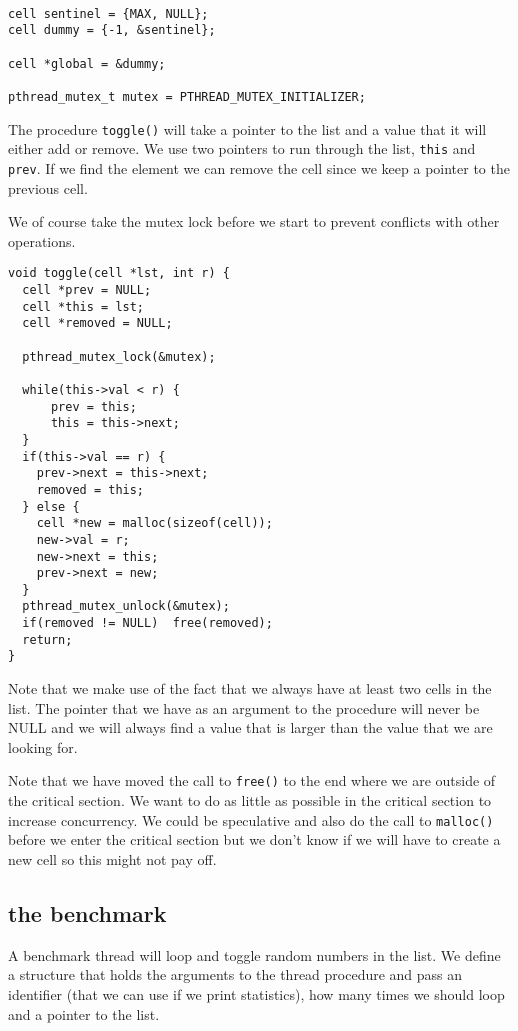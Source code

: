 \documentclass[a4paper,11pt]{article}
\begin{document}
\begin{lstlisting}

cell sentinel = {MAX, NULL};
cell dummy = {-1, &sentinel};

cell *global = &dummy;

pthread_mutex_t mutex = PTHREAD_MUTEX_INITIALIZER;
\end{lstlisting}

The procedure {\tt toggle()} will take a pointer to the list and a
value that it will either add or remove. We use two pointers to run
through the list, {\tt this} and {\tt prev}. If we find the element we
can remove the cell since we keep a pointer to the previous cell.

We of course take the mutex lock before we start to prevent conflicts
with other operations.

\begin{lstlisting}
void toggle(cell *lst, int r) {
  cell *prev = NULL;
  cell *this = lst;
  cell *removed = NULL;

  pthread_mutex_lock(&mutex);
  
  while(this->val < r) {
      prev = this;
      this = this->next;
  }
  if(this->val == r) {
    prev->next = this->next;
    removed = this;
  } else {
    cell *new = malloc(sizeof(cell));
    new->val = r;
    new->next = this;
    prev->next = new;
  }
  pthread_mutex_unlock(&mutex);        
  if(removed != NULL)  free(removed);
  return;
}
\end{lstlisting}

Note that we make use of the fact that we always have at least two
cells in the list. The pointer that we have as an argument to the
procedure will never be NULL and we will always find a value that is
larger than the value that we are looking for. 

Note that we have moved the call to {\tt free()} to the end where we
are outside of the critical section. We want to do as little as
possible in the critical section to increase concurrency. We could be
speculative and also do the call to {\tt malloc()} before we enter the
critical section but we don't know if we will have to create a new
cell so this might not pay off.

\subsection{the benchmark}

A benchmark thread will loop and toggle random numbers in the list. We
define a structure that holds the arguments to the thread procedure
and pass an identifier (that we can use if we print statistics), how
many times we should loop and a pointer to the list. 
\end{document}
